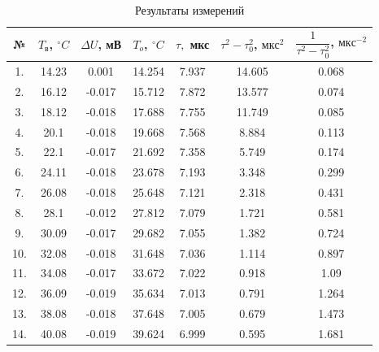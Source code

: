 \documentclass[12pt]{kiarticle}
\begin{document}
\begin{table}[htbp]
	\centering
	\caption{Результаты измерений}

\begin{tabular}{|c|c|c|c|c|c|c|} 
	\hline 
	№ &  $ T_в $, $ ^\circ C $ &  $ \varDelta  U $, мВ & $ T_o $, $ ^\circ C$ & $ \tau, $ мкс & $ \tau^2 - \tau_0^2 $, $ мкс^2 $ & $ \dfrac{1}{\tau^2 - \tau_0^2} $, $ мкс^{-2} $  \\ 	\hline
	
 1. & 14.23 & 0.001 & 14.254 & 7.937 & 14.605 & 0.068 \\
2. & 16.12 & -0.017 & 15.712 & 7.872 & 13.577 & 0.074 \\
3. & 18.12 & -0.018 & 17.688 & 7.755 & 11.749 & 0.085 \\
4. & 20.1 & -0.018 & 19.668 & 7.568 & 8.884 & 0.113 \\
5. & 22.1 & -0.017 & 21.692 & 7.358 & 5.749 & 0.174 \\
6. & 24.11 & -0.018 & 23.678 & 7.193 & 3.348 & 0.299 \\
7. & 26.08 & -0.018 & 25.648 & 7.121 & 2.318 & 0.431 \\
8. & 28.1 & -0.012 & 27.812 & 7.079 & 1.721 & 0.581 \\
9. & 30.09 & -0.017 & 29.682 & 7.055 & 1.382 & 0.724 \\
10. & 32.08 & -0.018 & 31.648 & 7.036 & 1.114 & 0.897 \\
11. & 34.08 & -0.017 & 33.672 & 7.022 & 0.918 & 1.09 \\
12. & 36.09 & -0.019 & 35.634 & 7.013 & 0.791 & 1.264 \\
13. & 38.08 & -0.018 & 37.648 & 7.005 & 0.679 & 1.473 \\
14. & 40.08 & -0.019 & 39.624 & 6.999 & 0.595 & 1.681 \\
	\hline

\end{tabular}%
\label{res}%
\end{table}%
\end{document}
